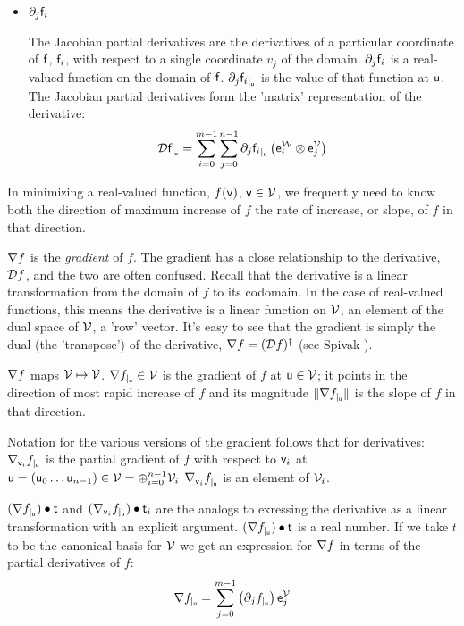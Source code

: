 \begin{itemize}
\item ${\partial}_{j}{\mathsf{f}_i}$

The Jacobian partial derivatives are the derivatives of
a particular coordinate of $\mathsf{f}$, $\mathsf{f}_i$, with respect to
a single coordinate $v_j$ of the domain.
${\partial}_{j}{\mathsf{f}_i}$ is a real-valued function on the domain of $\mathsf{f}$.
${\partial}_{j}{\mathsf{f}_i}_{\mid_{\mathsf{u}}}$ is the value of that function at $\mathsf{u}$.
The Jacobian partial derivatives form the 'matrix' representation of the derivative:
\begin{equation}
{\mathcal{D}{\mathsf{f}}_{\mid_{\mathsf{u}}}} =
\sum_{i=0}^{m-1}
\sum_{j=0}^{n-1}
{\partial}_{j}{\mathsf{f}_i}_{\mid_{\mathsf{u}}} \left( \mathsf{e}_i^{\mathcal{W}} \otimes \mathsf{e}_j^{\mathcal{V}} \right)
\end{equation}

\end{itemize}

In minimizing a real-valued function, $f(\mathsf{v})$, $\mathsf{v} \in \mathcal{V}$,
we frequently need to know both the direction of maximum increase of $f$
the rate of increase, or slope, of $f$ in that direction.

${\mathbf \nabla}{f}$ is the {\it gradient} of $f$.
The gradient has a close relationship to the derivative, ${\mathcal{D}{f}}$,
and the two are often confused.
Recall that the derivative is a linear transformation
from the domain of $f$ to its codomain.
In the case of real-valued functions,
this means the derivative is a linear function on $\mathcal{V}$,
an element of the dual space of $\mathcal{V}$, a 'row' vector.
It's easy to see that the gradient is simply the dual (the 'transpose')
of the derivative, ${\mathbf \nabla}{f} = ({\mathcal{D}{f}})^{\dagger}$
(see Spivak \cite[p.~96, ex.~4-18]{spivak-1965}).

${\mathbf \nabla}{f}$ maps $\mathcal{V} \mapsto \mathcal{V}$.
${\mathbf \nabla}{f}_{\mid_{\mathsf{u}}} \in \mathcal{V}$ is the gradient of $f$ at $\mathsf{u} \in \mathcal{V}$;
it points in the direction of most rapid increase of
$f$ and its magnitude $\| {\mathbf \nabla}{f}_{\mid_{\mathsf{u}}} \|$ is the
slope of $f$ in that direction.

Notation for the various versions of the gradient
follows that for derivatives:
${\mathbf \nabla}_{\mathsf{v}_i}{{f}}_{\mid_{\mathsf{u}}}$ is the partial gradient of $f$ with respect to $\mathsf{v}_i$ at
$\mathsf{u} = \left( \mathsf{u}_0 \ldots \mathsf{u}_{n-1} \right) \in \mathcal{V} = \oplus_{i=0}^{n-1} \mathcal{V}_i$
${\mathbf \nabla}_{\mathsf{v}_i}{{f}}_{\mid_{\mathsf{u}}}$ is an element of $\mathcal{V}_i$.

$({\mathbf \nabla}{f}_{\mid_{\mathsf{u}}}) \bullet  \mathsf{t}$
and
$({\mathbf \nabla}_{\mathsf{v}_i}{{f}}_{\mid_{\mathsf{u}}}) \bullet \mathsf{t}_i$
are the analogs to exressing the derivative as a linear transformation
with an explicit argument.
$({\mathbf \nabla}{f}_{\mid_{\mathsf{u}}}) \bullet  \mathsf{t}$ is a real number.
If we take $t$ to be the canonical basis for $\mathcal{V}$
we get an expression for ${\mathbf \nabla}{f}$ in terms of the partial derivatives of $f$:
\begin{equation}
\label{eq:gradient-from-partials}
{\mathbf \nabla}{f}_{\mid_{\mathsf{u}}} = \sum_{j=0}^{m-1} \left( {\partial}_{j}{f}_{\mid_{\mathsf{u}}} \right) \mathsf{e}_j^{\mathcal{V}}
\end{equation}

